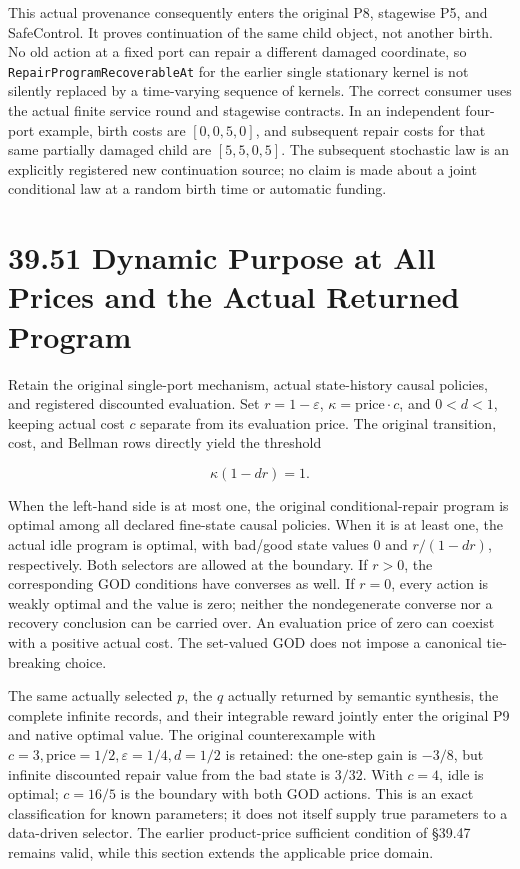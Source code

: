 \documentclass[
  english,
  11pt,
  oneside]{book}
\begin{document}
This actual provenance consequently enters the original P8, stagewise P5, and SafeControl. It proves continuation of the same child object, not another birth. No old action at a fixed port can repair a different damaged coordinate, so \nolinkurl{RepairProgramRecoverableAt} for the earlier single stationary kernel is not silently replaced by a time-varying sequence of kernels. The correct consumer uses the actual finite service round and stagewise contracts. In an independent four-port example, birth costs are \([0,0,5,0]\), and subsequent repair costs for that same partially damaged child are \([5,5,0,5]\). The subsequent stochastic law is an explicitly registered new continuation source; no claim is made about a joint conditional law at a random birth time or automatic funding.

\section{39.51 Dynamic Purpose at All Prices and the Actual Returned Program}\label{dynamic-purpose-at-all-prices-and-the-actual-returned-program}

Retain the original single-port mechanism, actual state-history causal policies, and registered discounted evaluation. Set \(r=1-\varepsilon\), \(\kappa=\mathrm{price}\cdot c\), and \(0<d<1\), keeping actual cost \(c\) separate from its evaluation price. The original transition, cost, and Bellman rows directly yield the threshold

\[\kappa(1-dr)=1.\]

When the left-hand side is at most one, the original conditional-repair program is optimal among all declared fine-state causal policies. When it is at least one, the actual idle program is optimal, with bad/good state values \(0\) and \(r/(1-dr)\), respectively. Both selectors are allowed at the boundary. If \(r>0\), the corresponding GOD conditions have converses as well. If \(r=0\), every action is weakly optimal and the value is zero; neither the nondegenerate converse nor a recovery conclusion can be carried over. An evaluation price of zero can coexist with a positive actual cost. The set-valued GOD does not impose a canonical tie-breaking choice.

The same actually selected \(p\), the \(q\) actually returned by semantic synthesis, the complete infinite records, and their integrable reward jointly enter the original P9 and native optimal value. The original counterexample with \(c=3,\mathrm{price}=1/2,\varepsilon=1/4,d=1/2\) is retained: the one-step gain is \(-3/8\), but infinite discounted repair value from the bad state is \(3/32\). With \(c=4\), idle is optimal; \(c=16/5\) is the boundary with both GOD actions. This is an exact classification for known parameters; it does not itself supply true parameters to a data-driven selector. The earlier product-price sufficient condition of §39.47 remains valid, while this section extends the applicable price domain.
\end{document}
